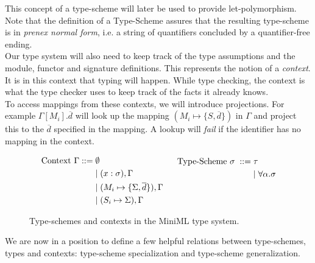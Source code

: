 \documentclass[10pt,a4paper,master=cws, masteroption=ai,english,inputenc=utf8]{kulemt}
\begin{document}
This concept of a type-scheme will later be used to provide %
let-polymorphism.  Note that the definition of a Type-Scheme assures that the resulting type-scheme is in \emph{prenex normal form}, i.e. a string of quantifiers concluded by a quantifier-free ending.
\\[2ex]
Our type system will also need to keep track of the type assumptions and the module, functor and signature definitions. This represents the notion of a \emph{context}. It is in this context that typing will happen. While type checking, the context is what the type checker uses to keep track of the facts it already knows.
\\[2ex]
To access mappings from these contexts, we will introduce projections. For example $\Gamma[M_{i}].\overline{d}$ will look up the mapping $(M_{i} \mapsto \lbrace S,\overline{d}\rbrace)$ in $\Gamma$ and project this to the $\overline{d}$ specified in the mapping. A lookup will \emph{fail} if the identifier has no mapping in the context.

\begin{figure}[!htb]
\begin{align*}
\begin{aligned}
\text{Context }\Gamma ::=\; &\emptyset \\
&| \; (x:\sigma),\Gamma \\
&| \; (M_{i} \mapsto \lbrace \Sigma,\overline{d}\rbrace), \Gamma \\
&| \; (S_{i} \mapsto \Sigma), \Gamma
\end{aligned}
\begin{aligned}
\;\;\;\;\;\;
\end{aligned}
\begin{aligned}
\text{Type-Scheme } \sigma \; ::= \; &\tau \\
&| \; \forall \alpha . \sigma \\
\\
\\
\end{aligned}
\end{align*}
\caption{Type-schemes and contexts in the MiniML type system.}
\label{fig:Type-schemesAndContexts}
\end{figure}

We are now in a position to define a few helpful relations between type-schemes, types and contexts: type-scheme specialization and type-scheme generalization.
\end{document}

